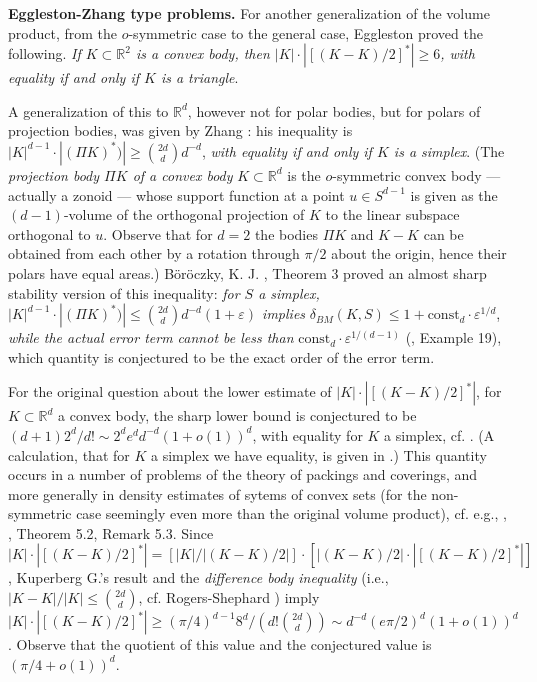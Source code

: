 \documentclass[12pt]{article}
\begin{document}
{\bf{Eggleston-Zhang type problems.}}
For another generalization 
of the volume product, from the $o$-symmetric case to the general case,
Eggleston \cite{E} proved the following. {\it{If
$K \subset {\mathbb R}^2$ is a convex body, then $|K| \cdot 
| [(K-K)/2] ^* |
\ge 6$, with equality if and only if $K$ is a triangle}}. 

A generalization of this to ${\mathbb R}^d$, however
not for polar bodies, but for polars of
projection bodies, was given by Zhang \cite{Z}: 
his inequality is $|K|^{d-1} \cdot | 
(\Pi K)^*) | \ge \binom{2d}{d}d^{-d}$, {\it{with equality if and only if $K$
is a simplex}}. (The {\it{projection body $\Pi K$ 
of a convex body}} $K \subset {\mathbb R}^d$ is the 
$o$-symmetric convex body --- actually a zonoid --- whose support function at a
point $u \in S^{d-1}$ is given as the $(d-1)$-volume of the orthogonal
projection of $K$ to the linear subspace orthogonal to $u$. Observe
that for $d=2$ the bodies $\Pi K$ and $K-K$ can be obtained from each other by
a rotation through $ \pi /2$ about the origin, hence their polars 
have equal areas.)
B\"or\"oczky, K. J. \cite{Bo05}, Theorem 3 
proved an almost sharp stability version of
this inequality: {\it{for $S$ a simplex, $|K|^{d-1} \cdot 
| (\Pi K)^*) | \le \binom{2d}{d}d^{-d}(1+\varepsilon)$ implies}} $\delta
_{BM} (K, S) \le 1+ {\text{const}}_d \cdot \varepsilon ^{1/d}$, {\it{while
the actual error term cannot be less than}} 
${\text{const}}_d \cdot \varepsilon ^{1/(d-1)}$ (\cite{Bo05}, Example 19),
which quantity is conjectured
to be the exact order of the error term.

For the original question about the lower estimate of 
$|K| \cdot | [(K-K)/2] ^* |$, 
for $K \subset {\mathbb R}^d$ a convex
body, the sharp lower bound is conjectured to be $(d+1)2^d/ d! \sim 2^d e^d
d^{-d} \left( 1+o(1) \right) ^d$, with equality
for $K$ a simplex, cf. \cite{Mak78}. 
(A calculation, that for $K$ a simplex we have
equality, is given 
in \cite{MM}.) This quantity occurs in a number of problems of 
the theory of packings and coverings, and more generally in density 
estimates of sytems of convex sets
(for the non-symmetric case seemingly even more than the
original volume product), 
cf. e.g., \cite{Mak78}, \cite{Mak87}, \cite{MM96} Theorem 5.2, Remark 5.3.
Since $|K| \cdot | [(K-K)/2] ^* |=
[|K|/| (K-K)/2 | ] \cdot [ | (K-K)/2 | \cdot 
| [(K-K)/2] ^* | ] $,
Kuperberg G.'s result and the {\it{difference body inequality}} 
(i.e., $|K-K|/|K| \le {\binom{2d}{d}}$, cf. Rogers-Shephard \cite{RS}) imply 
$|K| \cdot |  [ (K-K)/2 ] ^* | 
\ge 
( \pi /4)^{d-1} 8^d/ \left( d!{\binom{2d}{d}} \right) 
\sim 
d^{-d} (e \pi /2)^d  \left( 1+o(1) \right) ^d$.
Observe that the quotient of this value and the conjectured value is 
$\left( \pi /4 +o(1) \right) ^d$.
\end{document}
